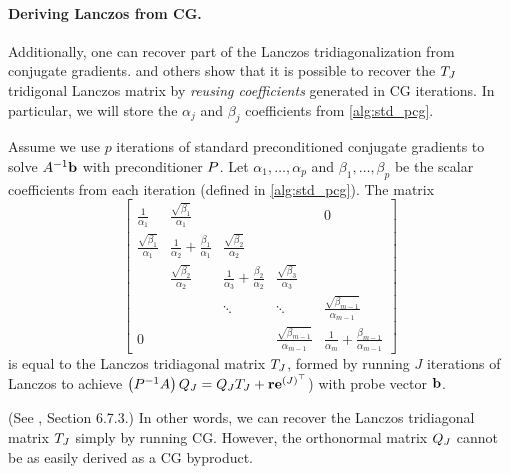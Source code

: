 \paragraph{Deriving Lanczos from CG.}
Additionally, one can recover part of the Lanczos tridiagonalization from conjugate gradients.
\citet{saad2003iterative} and others show that it is possible to recover the $T_J$ tridigonal Lanczos matrix by \emph{reusing coefficients} generated in CG iterations.
In particular, we will store the $\alpha_j$ and $\beta_j$ coefficients from \autoref{alg:std_pcg}.
%
\begin{observation}
  Assume we use $p$ iterations of standard preconditioned conjugate gradients to solve $A^{-1} \mathbf{b}$ with preconditioner $P$.
  Let $\alpha_1, \ldots, \alpha_p$ and $\beta_1, \ldots, \beta_p$ be the scalar coefficients from each iteration (defined in \autoref{alg:std_pcg}).
  The matrix
  \begin{equation*}
    \left[\begin{array}{ccccc}
      \frac{1}{\alpha_1} & \frac{\sqrt{\beta_1}}{\alpha_1} &  & & 0 \\
      \frac{\sqrt{\beta_1}}{\alpha_1} & \frac{1}{\alpha_2} + \frac{\beta_1}{\alpha_1} & \frac{\sqrt{\beta_2}}{\alpha_2} &  &  \\
      & \frac{\sqrt{\beta_2}}{\alpha_2} & \frac{1}{\alpha_3} + \frac{\beta_2}{\alpha_2} & \frac{\sqrt{\beta_3}}{\alpha_3} &  \\
      &       & \ddots & \ddots & \frac{\sqrt{\beta_{m-1}}}{\alpha_{m-1}} \\
      0 &       &        & \frac{\sqrt{\beta_{m-1}}}{\alpha_{m-1}} & \frac{1}{\alpha_m} + \frac{\beta_{m-1}}{\alpha_{m-1}}
    \end{array}\right]
  \end{equation*}
  is equal to the Lanczos tridiagonal matrix $T_J$, formed by running $J$ iterations of Lanczos to achieve $\left( P^{-1} A \right) Q_J = Q_J T_J + \mathbf{r} \mathbf{e}^{(J)^\top}$) with probe vector $\mathbf{b}$.
  \label{obs:lanczos_cg}
\end{observation}
(See \cite{saad2003iterative}, Section 6.7.3.)
In other words, we can recover the Lanczos tridiagonal matrix $T_J$ simply by running CG.
However, the orthonormal matrix $Q_J$ cannot be as easily derived as a CG byproduct.
